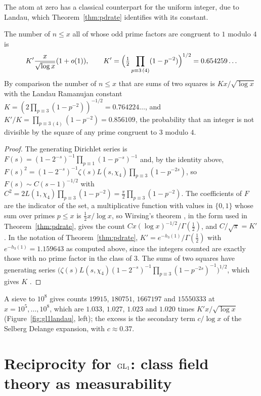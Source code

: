 The atom at zero has a classical counterpart for the uniform integer, due to Landau, which Theorem~\ref{thm:pdrate} identifies with its constant.

\begin{theorem}\label{thm:gl1landau}
The number of $n\le x$ all of whose odd prime factors are congruent to $1$ modulo $4$ is
\[
K'\frac{x}{\sqrt{\log x}}(1+o(1)),\qquad K'=\Bigl(\tfrac12\prod_{p\equiv3\,(4)}(1-p^{-2})\Bigr)^{1/2}=0.654259\ldots
\]
By comparison the number of $n\le x$ that are sums of two squares is $Kx/\sqrt{\log x}$ with the Landau Ramanujan constant $K=(2\prod_{p\equiv3}(1-p^{-2}))^{-1/2}=0.764224\ldots$, and $K'/K=\prod_{p\equiv3\,(4)}(1-p^{-2})=0.856109$, the probability that an integer is not divisible by the square of any prime congruent to $3$ modulo $4$.
\end{theorem}

\begin{proof}
The generating Dirichlet series is $F(s)=(1-2^{-s})^{-1}\prod_{p\equiv1}(1-p^{-s})^{-1}$ and, by the identity above, $F(s)^2=(1-2^{-s})^{-1}\zeta(s)L(s,\chi_4)\prod_{p\equiv3}(1-p^{-2s})$, so $F(s)\sim C(s-1)^{-1/2}$ with $C^2=2L(1,\chi_4)\prod_{p\equiv3}(1-p^{-2})=\frac\pi2\prod_{p\equiv3}(1-p^{-2})$. The coefficients of $F$ are the indicator of the set, a multiplicative function with values in $\{0,1\}$ whose sum over primes $p\le x$ is $\frac12x/\log x$, so Wirsing's theorem \cite{wirsing1961}, in the form used in Theorem~\ref{thm:pdrate}, gives the count $Cx(\log x)^{-1/2}/\Gamma(\frac12)$, and $C/\sqrt\pi=K'$. In the notation of Theorem~\ref{thm:pdrate}, $K'=e^{-h_3(1)}/\Gamma(\frac12)$ with $e^{-h_3(1)}=1.159643$ as computed above, since the integers counted are exactly those with no prime factor in the class of $3$. The sums of two squares have generating series $\bigl(\zeta(s)L(s,\chi_4)(1-2^{-s})^{-1}\prod_{p\equiv3}(1-p^{-2s})^{-1}\bigr)^{1/2}$, which gives $K$ \cite{landau1908}.
\end{proof}

A sieve to $10^8$ gives counts $19915$, $180751$, $1667197$ and $15550333$ at $x=10^5,\dots,10^8$, which are $1.033$, $1.027$, $1.023$ and $1.020$ times $K'x/\sqrt{\log x}$ (Figure~\ref{fig:gl1landau}, left); the excess is the secondary term $c/\log x$ of the Selberg Delange expansion, with $c\approx0.37$.

\section{Reciprocity for \texorpdfstring{$\mathrm{GL}_1$}{GL1}: class field theory as measurability}\label{sec:gl1cft}

